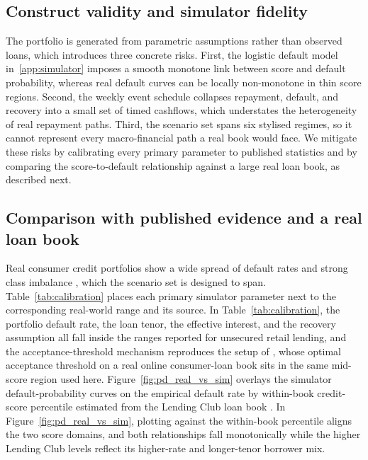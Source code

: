 \documentclass[preprint,review,authoryear,12pt]{elsarticle}
\begin{document}
\subsection{Construct validity and simulator fidelity}
The portfolio is generated from parametric assumptions rather than observed loans, which introduces three concrete risks. First, the logistic default model in~\ref{app:simulator} imposes a smooth monotone link between score and default probability, whereas real default curves can be locally non-monotone in thin score regions. Second, the weekly event schedule collapses repayment, default, and recovery into a small set of timed cashflows, which understates the heterogeneity of real repayment paths. Third, the scenario set spans six stylised regimes, so it cannot represent every macro-financial path a real book would face. We mitigate these risks by calibrating every primary parameter to published statistics and by comparing the score-to-default relationship against a large real loan book, as described next.

\subsection{Comparison with published evidence and a real loan book}
Real consumer credit portfolios show a wide spread of default rates and strong class imbalance \citep{brownmues2012}, which the scenario set is designed to span. Table~\ref{tab:calibration} places each primary simulator parameter next to the corresponding real-world range and its source. In Table~\ref{tab:calibration}, the portfolio default rate, the loan tenor, the effective interest, and the recovery assumption all fall inside the ranges reported for unsecured retail lending, and the acceptance-threshold mechanism reproduces the setup of \citet{herasymovych2019}, whose optimal acceptance threshold on a real online consumer-loan book sits in the same mid-score region used here. Figure~\ref{fig:pd_real_vs_sim} overlays the simulator default-probability curves on the empirical default rate by within-book credit-score percentile estimated from the Lending Club loan book \citep{xia2017}. In Figure~\ref{fig:pd_real_vs_sim}, plotting against the within-book percentile aligns the two score domains, and both relationships fall monotonically while the higher Lending Club levels reflect its higher-rate and longer-tenor borrower mix.
\end{document}

